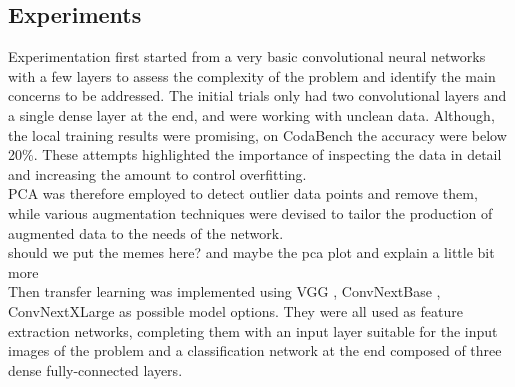 \documentclass[11pt]{article}
\begin{document}
\begin{multicols}{2}
        \section{Experiments}
		Experimentation first started from a very basic convolutional neural networks with a few layers to assess the complexity of the problem and identify the main concerns to be addressed. The initial trials only had two convolutional layers and a single dense layer at the end, and were working with unclean data. 
        Although, the local training results were promising, on CodaBench the accuracy were below 20\%.
        These attempts highlighted the importance of inspecting the data in detail and increasing the amount to control overfitting. \\  
        PCA \cite{jolliffe2016principal} was therefore employed to detect outlier data points and remove them, while various augmentation techniques were devised to tailor the production of augmented data to the needs of the network. \\
        \color{red} should we put the memes here? and maybe the pca plot and explain a little bit more \color{black}\\
        Then transfer learning was implemented using VGG \cite{simonyan2014very}, ConvNextBase \cite{liu2022convnet}, ConvNextXLarge\cite{liu2022convnet} as possible model options. 
        They were all used as feature extraction networks, completing them with an input layer suitable for the input images of the problem and a classification network at the end composed of three dense fully-connected layers. \\

\end{multicols}
\end{document}
